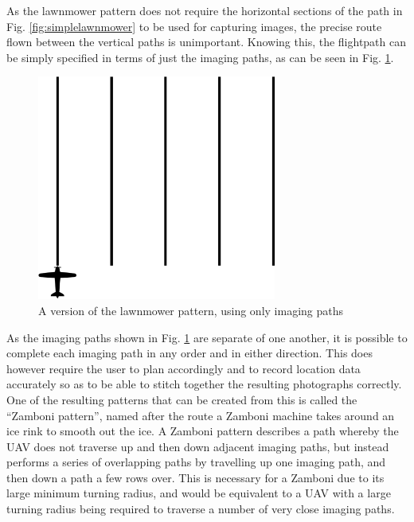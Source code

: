As the lawnmower pattern does not require the horizontal sections of the path in Fig. \ref{fig:simplelawnmower} to be used for capturing images, the precise route flown between the vertical paths is unimportant. Knowing this, the flightpath can be simply specified in terms of just the imaging paths, as can be seen in Fig. \ref{fig:imaginglawnmower}.

\begin{figure}[htbp!] 
\centering    
\includegraphics[width=0.7\textwidth]{ImagingLawnmower}
\caption[The lawnmower pattern displayed using only imaging paths]{A version of the lawnmower pattern, using only imaging paths}
\label{fig:imaginglawnmower}
\end{figure}

As the imaging paths shown in Fig. \ref{fig:imaginglawnmower} are separate of one another, it is possible to complete each imaging path in any order and in either direction. This does however require the user to plan accordingly and to record location data accurately so as to be able to stitch together the resulting photographs correctly. One of the resulting patterns that can be created from this is called the ``Zamboni pattern'', named after the route a Zamboni machine takes around an ice rink to smooth out the ice. A Zamboni pattern describes a path whereby the UAV does not traverse up and then down adjacent imaging paths, but instead performs a series of overlapping paths by travelling up one imaging path, and then down a path a few rows over. This is necessary for a Zamboni due to its large minimum turning radius, and would be equivalent to a UAV with a large turning radius being required to traverse a number of very close imaging paths. 

